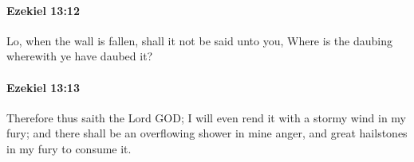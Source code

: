 		\paragraph{Ezekiel 13:12} %
			\label{EZEKIEL-13-12}

			Lo, when the wall is fallen, shall it not be said unto you, Where is the daubing wherewith ye have daubed it?


		\paragraph{Ezekiel 13:13} %
			\label{EZEKIEL-13-13}

			Therefore thus saith the Lord GOD; I will even rend it with a stormy wind in my fury; and there shall be an overflowing shower in mine anger, and great hailstones in my fury to consume it.


